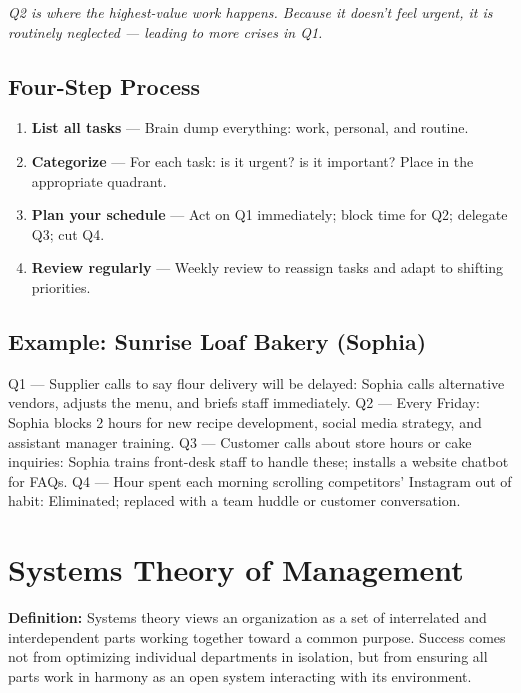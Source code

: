 \documentclass[11pt, letterpaper]{article}
\begin{document}
\textit{Q2 is where the highest-value work happens. Because it doesn't feel urgent, it is routinely neglected --- leading to more crises in Q1.}

\subsection{Four-Step Process}

\begin{enumerate}[leftmargin=*, label=\textbf{Step \arabic*.}]
  \item \textbf{List all tasks} --- Brain dump everything: work, personal, and routine.
  \item \textbf{Categorize} --- For each task: is it urgent? is it important? Place in the appropriate quadrant.
  \item \textbf{Plan your schedule} --- Act on Q1 immediately; block time for Q2; delegate Q3; cut Q4.
  \item \textbf{Review regularly} --- Weekly review to reassign tasks and adapt to shifting priorities.
\end{enumerate}

\subsection{Example: Sunrise Loaf Bakery (Sophia)}

Q1 --- Supplier calls to say flour delivery will be delayed: Sophia calls alternative vendors, adjusts the menu, and briefs staff immediately. Q2 --- Every Friday: Sophia blocks 2 hours for new recipe development, social media strategy, and assistant manager training. Q3 --- Customer calls about store hours or cake inquiries: Sophia trains front-desk staff to handle these; installs a website chatbot for FAQs. Q4 --- Hour spent each morning scrolling competitors' Instagram out of habit: Eliminated; replaced with a team huddle or customer conversation.

\newpage

\section{Systems Theory of Management}

\begin{defbox}
\textbf{Definition:} Systems theory views an organization as a set of interrelated and interdependent parts working together toward a common purpose. Success comes not from optimizing individual departments in isolation, but from ensuring all parts work in harmony as an open system interacting with its environment.
\end{defbox}
\end{document}
